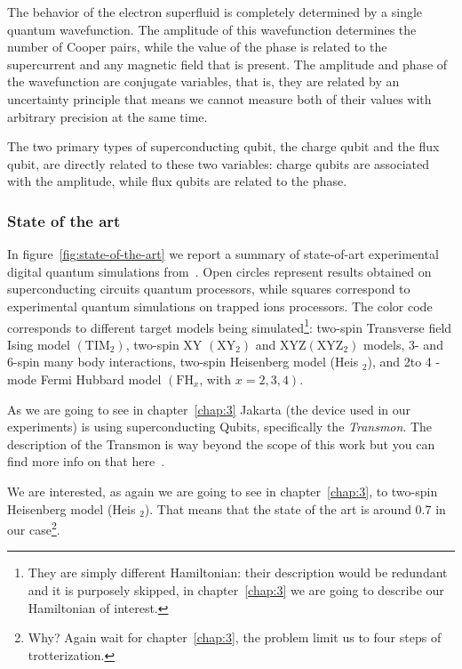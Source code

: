The behavior of the electron superfluid is completely determined by a single quantum wavefunction. The amplitude of this wavefunction determines the number of Cooper pairs, while the value of the phase is related to the supercurrent and any magnetic field that is present. The amplitude and phase of the wavefunction are conjugate variables, that is, they are related by an uncertainty principle that means we cannot measure both of their values with arbitrary precision at the same time. 

The two primary types of superconducting qubit, the charge qubit and the flux qubit, are directly related to these two variables: charge qubits are associated with the amplitude, while flux qubits are related to the phase. \cite{Supercon84:online}

\subsubsection*{State of the art}

In figure~\ref{fig:state-of-the-art} we report a summary of state-of-art experimental digital quantum simulations from~\cite{UQC}. Open circles represent results obtained on superconducting circuits quantum processors, while squares correspond to experimental quantum simulations on trapped ions processors. The color code corresponds to different target models being simulated\footnote{They are simply different Hamiltonian: their description would be redundant and it is purposely skipped, in chapter~\ref{chap:3} we are going to describe our Hamiltonian of interest.}: two-spin Transverse field Ising model $\left(\mathrm{TIM}_{2}\right)$, two-spin XY $\left(\mathrm{XY}_{2}\right)$ and $\mathrm{XYZ}\left(\mathrm{XYZ}_{2}\right)$ models, 3- and 6-spin many body interactions, two-spin Heisenberg model (Heis ${ }_{2}$), and 2to 4 -mode Fermi Hubbard model $\left(\mathrm{FH}_{x}\right.$, with $\left.x=2,3,4\right)$.

As we are going to see in chapter~\ref{chap:3} Jakarta (the device used in our experiments) is using superconducting Qubits, specifically the \emph{Transmon}. The description of the Transmon is way beyond the scope of this work but you can find more info on that here~\cite{Transmon}.

We are interested, as again we are going to see in chapter~\ref{chap:3}, to two-spin Heisenberg model (Heis ${ }_{2}$). That means that the state of the art is around 0.7 in our case\footnote{Why? Again wait for chapter~\ref{chap:3}, the problem limit us to four steps of trotterization.}.

